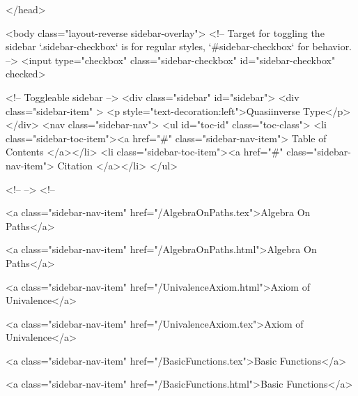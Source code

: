   
</head>




  <body class="layout-reverse sidebar-overlay">
    <!-- Target for toggling the sidebar `.sidebar-checkbox` is for regular
     styles, `#sidebar-checkbox` for behavior. -->
<input type="checkbox" class="sidebar-checkbox" id="sidebar-checkbox" checked>

<!-- Toggleable sidebar -->
<div class="sidebar" id="sidebar">
  <div class="sidebar-item" >
    <p style="text-decoration:left">Quasiinverse Type</p>
  </div>
  <nav class="sidebar-nav">
    <ul id="toc-id" class="toc-class">
  <li class="sidebar-toc-item"><a href="#" class="sidebar-nav-item"> Table of Contents </a></li>
  <li class="sidebar-toc-item"><a href="#" class="sidebar-nav-item"> Citation </a></li>
</ul>


    <!--  -->
    <!-- 
      
    
      
    
      
    
      
        
      
    
      
        
          <a class="sidebar-nav-item" href="/AlgebraOnPaths.tex">Algebra On Paths</a>
        
      
    
      
        
          <a class="sidebar-nav-item" href="/AlgebraOnPaths.html">Algebra On Paths</a>
        
      
    
      
        
          <a class="sidebar-nav-item" href="/UnivalenceAxiom.html">Axiom of Univalence</a>
        
      
    
      
        
          <a class="sidebar-nav-item" href="/UnivalenceAxiom.tex">Axiom of Univalence</a>
        
      
    
      
        
          <a class="sidebar-nav-item" href="/BasicFunctions.tex">Basic Functions</a>
        
      
    
      
        
          <a class="sidebar-nav-item" href="/BasicFunctions.html">Basic Functions</a>
        
      
    
